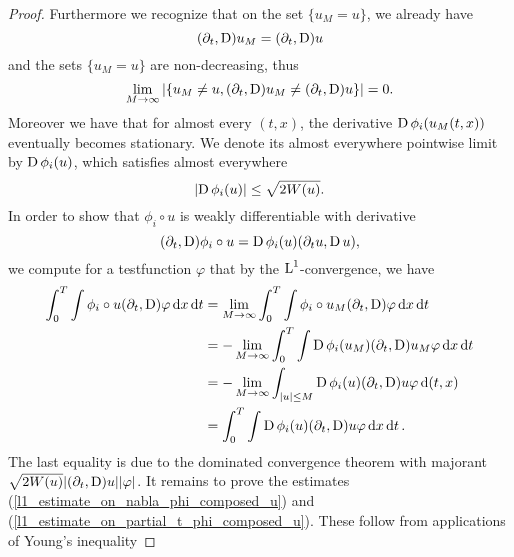\begin{proof}
	Furthermore we recognize that on the set $ \{ u_{M } = u \} $, we already have
	\begin{equation*}
		( \partial_{ t } , \operatorname{D} ) u_{ M }
		=
		( \partial_{ t } , \operatorname{D} ) u
	\end{equation*}
	and the sets $ \{ u_{ M } = u \} $ are non-decreasing, thus
	\begin{equation*}
		\lim_{ M \to \infty }
		\abs{
			\left\{
				u_{ M } \neq u, ( \partial_{ t } , \operatorname{D} ) u_{ M } \neq ( 
				\partial_{ t }, \operatorname{D} ) u 
			\right\}
		}
		=
		0.
	\end{equation*}
	Moreover we have that for almost every $ ( t, x ) $, the derivative $ \operatorname{D} 
	\phi_{ i } ( u_{ M } ( t , x ) ) $ eventually becomes stationary. We denote 
	its almost everywhere pointwise limit by $ \operatorname{D} \phi_{ i } ( u ) $, which 
	satisfies almost everywhere
	\begin{equation*}
		\abs{
			\operatorname{D} \phi_{ i } ( u ) 
		}
		\leq
		\sqrt{ 2 W ( u ) }.
	\end{equation*}
	In order to show that $ \phi_{ i } \circ u $ is weakly differentiable with derivative 
	\begin{equation*}
		( \partial_{ t } , \operatorname{D} ) \phi_{ i } \circ u
		=
		\operatorname{D} \phi_{ i } ( u ) ( \partial_{ t } u, \operatorname{D} u ),
	\end{equation*}
	we compute for a testfunction $ \varphi $ that by the $ \operatorname{L}^{ 1 } $-convergence, we have
	\begin{align*}
		\int_{ 0 }^{ T }
		\int
			\phi_{ i } \circ u
			( \partial_{ t } , \operatorname{D} ) \varphi
		\dd{ x}
		\dd{ t }
		&
		=
		\lim_{ M \to \infty }
			\int_{0 }^{ T }
				\int
					\phi_{ i } \circ u_{ M }
					( \partial_{ t } , \operatorname{D}) \varphi
				\dd{ x }
			\dd{ t }
		\\
		& =
		- \lim_{ M \to \infty }
			\int_{ 0 }^{ T }
			\int
				\operatorname{D} \phi_{ i } ( u_{ M } )
				( \partial_{ t } , \operatorname{D} ) u_{ M }
				\varphi
			\dd{ x }
		\dd{ t }
		\\
		& =
		- \lim_{ M \to \infty }
			\int_{ \abs{ u } \leq M }
				\operatorname{D} \phi_{ i } ( u ) 
				( \partial_{ t } , \operatorname{D} ) u
				\varphi
			\dd{ ( t, x ) }
		\\
		& =
		\int_{ 0 }^{ T }
			\int
				\operatorname{D} \phi_{ i } ( u ) 
				( \partial_{ t } , \operatorname{D} ) u
				\varphi
			\dd{ x }
		\dd{ t }.
	\end{align*}
	The last equality is due to the dominated convergence theorem with 
	majorant $ \sqrt{ 2 W ( u ) } \abs{ ( \partial_{ t } , 
	\operatorname{D} ) u } \abs{ \varphi } $.
	It remains to prove the estimates (\ref{l1_estimate_on_nabla_phi_composed_u}) and (\ref{l1_estimate_on_partial_t_phi_composed_u}). These follow from applications of Young's inequality

\end{proof}
